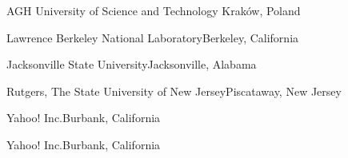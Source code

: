 \begin{multicols}{2}
 {AGH University of Science and Technology}{
Krak{\'o}w, Poland}


 {Lawrence Berkeley National
Laboratory}{Berkeley, California}

 {Jacksonville State University}{Jacksonville,
Alabama}

 {Rutgers, The State University of New
Jersey}{Piscataway, New Jersey}

 {Yahoo! Inc.}{Burbank, California}

 {Yahoo! Inc.}{Burbank, California}

\end{multicols}
